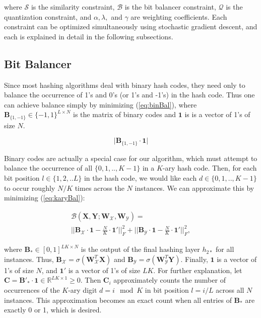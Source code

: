 \documentclass[letterpaper]{article}
\newcommand{\bpx}{\mathbf{B_\mathcal{X}}}
\newcommand{\bpy}{\mathbf{B_\mathcal{Y}}}
\newcommand{\bps}{\mathbf{B_*}}
\newcommand{\WX}{\mathbf{W}_\mathcal{X}}
\newcommand{\WY}{\mathbf{W}_\mathcal{Y}}
\newcommand{\X}{\mathbf{X}}
\newcommand{\Y}{\mathbf{Y}}
\begin{document}
\noindent where $ \mathcal{S} $ is the similarity constraint, $ \mathcal{B} $ is the bit balancer constraint, $ \mathcal{Q} $ is the quantization constraint, and $ \alpha, \lambda, $ and $ \gamma $ are weighting coefficients. Each constraint can be optimized simultaneously using stochastic gradient descent, and each is explained in detail in the following subsections.

\subsection{Bit Balancer}

Since most hashing algorithms deal with binary hash codes, they need only to balance the occurrence of 1's and 0's (or 1's and -1's) in the hash code. Thus one can achieve balance simply by minimizing (\ref{eq:binBal}), where $ \mathbf{B}_{\{1,-1\}} \in \{-1,1\}^{L \times N} $ is the matrix of binary codes and $ \mathbf{1} $ is is a vector of 1's of size $ N $.

\begin{equation}
\label{eq:binBal}
\big| \mathbf{B}_{\{1,-1\}} \cdot \mathbf{1} \big|
\end{equation}

Binary codes are actually a special case for our algorithm, which must attempt to balance the occurrence of all $ \{0,1,.., K-1\} $ in a $K$-ary hash code. Then, for each bit position $ l \in \{1,2,..L\} $ in the hash code, we would like each $ d \in \{0,1,.., K-1\} $ to occur roughly $ N / K $ times across the $ N $ instances. We can approximate this by minimizing (\ref{eq:karyBal}): 

\begin{equation}
\label{eq:karyBal}
\begin{gathered}
\mathcal{B}(\X,\Y; \WX, \WY) = \\
\Big|\Big| \bpx \cdot \mathbf{1} - \frac{N}{K} \cdot \mathbf{1'} \Big|\Big|_F^2 + \Big|\Big| \bpy \cdot \mathbf{1} - \frac{N}{K} \cdot \mathbf{1'} \Big|\Big|_F^2,
\end{gathered}
\end{equation}

\noindent where $ \bps \in [0,1]^{LK \times N} $ is the output of the final hashing layer $ h_{2*} $ for all instances. Thus, $ \bpx = \sigma(\WX^T\X) $ and $ \bpy = \sigma(\WY^T\Y) $. Finally, $ \mathbf{1} $ is a vector of 1's of size $ N $, and $ \mathbf{1}' $ is a vector of 1's of size $ LK $. For further explanation, let $ \mathbf{C} = \mathbf{B'_\mathcal{*}} \cdot \mathbf{1} \in \mathbb{R}^{LK \times 1} \geq 0 $. Then $ \mathbf{C}_i $ approximately counts the number of occurrences of the $K$-ary digit $ d = i \mod K $ in bit position $ l = i / L $ across all $ N $ instances. This approximation becomes an exact count when all entries of $ \bps $ are exactly 0 or 1, which is desired.
\end{document}
